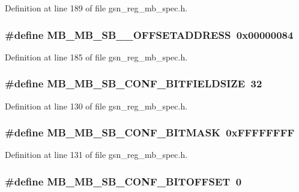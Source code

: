 Definition at line 189 of file gsn\_\-reg\_\-mb\_\-spec.h.

\hypertarget{a00562_a82c49e5e657b719dfd114c72f27ebd30}{
\subsubsection[{MB\_\-MB\_\-SB\_\-1\_\-OFFSETADDRESS}]{\setlength{\rightskip}{0pt plus 5cm}\#define MB\_\-MB\_\-SB\_\_\-OFFSETADDRESS~0x00000084}}
\label{a00562_a82c49e5e657b719dfd114c72f27ebd30}


Definition at line 185 of file gsn\_\-reg\_\-mb\_\-spec.h.

\hypertarget{a00562_a31950d7a198b998ecb323fc0aa1e16b6}{
\subsubsection[{MB\_\-MB\_\-SB\_\-CONF\_\-BITFIELDSIZE}]{\setlength{\rightskip}{0pt plus 5cm}\#define MB\_\-MB\_\-SB\_\-CONF\_\-BITFIELDSIZE~32}}
\label{a00562_a31950d7a198b998ecb323fc0aa1e16b6}


Definition at line 130 of file gsn\_\-reg\_\-mb\_\-spec.h.

\hypertarget{a00562_ab447d91be169dfb8055485302e33b1f8}{
\subsubsection[{MB\_\-MB\_\-SB\_\-CONF\_\-BITMASK}]{\setlength{\rightskip}{0pt plus 5cm}\#define MB\_\-MB\_\-SB\_\-CONF\_\-BITMASK~0xFFFFFFFF}}
\label{a00562_ab447d91be169dfb8055485302e33b1f8}


Definition at line 131 of file gsn\_\-reg\_\-mb\_\-spec.h.

\hypertarget{a00562_aefbaca2e8d5e7787a4f06438d4cbd0bd}{
\subsubsection[{MB\_\-MB\_\-SB\_\-CONF\_\-BITOFFSET}]{\setlength{\rightskip}{0pt plus 5cm}\#define MB\_\-MB\_\-SB\_\-CONF\_\-BITOFFSET~0}}
\label{a00562_aefbaca2e8d5e7787a4f06438d4cbd0bd}


